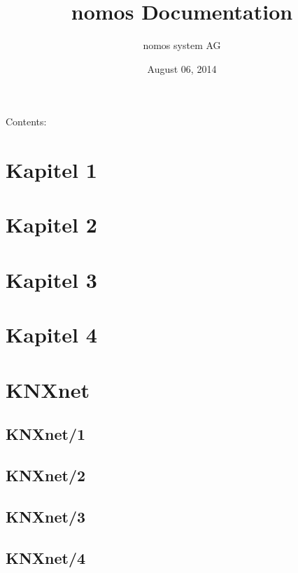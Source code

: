 \documentclass[letterpaper,10pt,english]{sphinxmanual}
\title{nomos Documentation}
\date{August 06, 2014}
\author{nomos system AG}
\begin{document}
\maketitle
\tableofcontents
{}\label{index::doc}


Contents:


\chapter{Kapitel 1}
\label{chapter_1::doc}\label{chapter_1:kapitel-1}\label{chapter_1:welcome-to-nomos-s-documentation}

\chapter{Kapitel 2}
\label{chapter_2:kapitel-2}\label{chapter_2::doc}

\chapter{Kapitel 3}
\label{chapter_3:kapitel-3}\label{chapter_3::doc}

\chapter{Kapitel 4}
\label{chapter_4::doc}\label{chapter_4:kapitel-4}

\chapter{\textbf{KNXnet}}
\label{chapter_5:knxnet}\label{chapter_5::doc}

\section{KNXnet/1}
\label{chapter_5:knxnet-1}

\section{KNXnet/2}
\label{chapter_5:knxnet-2}

\section{KNXnet/3}
\label{chapter_5:knxnet-3}

\section{KNXnet/4}
\label{chapter_5:knxnet-4}
\end{document}
